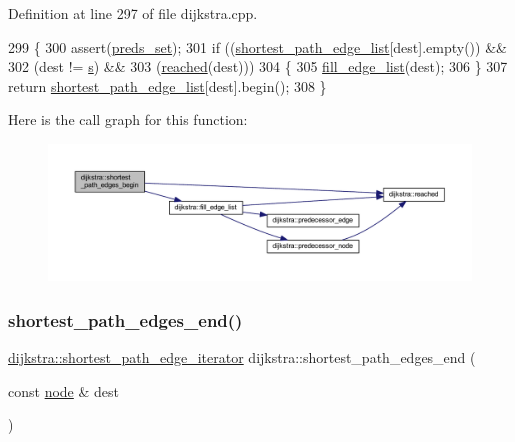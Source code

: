 Definition at line 297 of file dijkstra.\+cpp.


\begin{DoxyCode}
299 \{
300     assert(\mbox{\hyperlink{classdijkstra_aaba530e703b5d4005b3c01fa1a11182d}{preds\_set}});
301     \textcolor{keywordflow}{if} ((\mbox{\hyperlink{classdijkstra_a4c647f083ee4d12327e5c1ea3bf2e7c2}{shortest\_path\_edge\_list}}[dest].empty()) &&
302     (dest != \mbox{\hyperlink{classdijkstra_a721bfb648626a1be2b9d276d85ebdb9d}{s}}) &&
303     (\mbox{\hyperlink{classdijkstra_a405ff80abfc9ad98668534032eed6a5b}{reached}}(dest)))
304     \{
305     \mbox{\hyperlink{classdijkstra_ab2dfb6e0c2b9084fa17e2e6349e20ad9}{fill\_edge\_list}}(dest);
306     \}
307     \textcolor{keywordflow}{return} \mbox{\hyperlink{classdijkstra_a4c647f083ee4d12327e5c1ea3bf2e7c2}{shortest\_path\_edge\_list}}[dest].begin();
308 \}
\end{DoxyCode}
Here is the call graph for this function\+:\nopagebreak
\begin{figure}[H]
\begin{center}
\leavevmode
\includegraphics[width=350pt]{classdijkstra_ad7ef6f747b68f8951322b265844dbb8a_cgraph}
\end{center}
\end{figure}
\mbox{\label{classdijkstra_a031e6fef10aa40aad10edc1053ad9cf0}} 
\subsubsection{\texorpdfstring{shortest\+\_\+path\+\_\+edges\+\_\+end()}{shortest\_path\_edges\_end()}}
{\footnotesize\ttfamily \mbox{\hyperlink{classdijkstra_afb9a918f95b13aefcef331896fe3b41c}{dijkstra\+::shortest\+\_\+path\+\_\+edge\+\_\+iterator}} dijkstra\+::shortest\+\_\+path\+\_\+edges\+\_\+end (\begin{DoxyParamCaption}\item[{const \mbox{\hyperlink{classnode}{node}} \&}]{dest }\end{DoxyParamCaption})}



